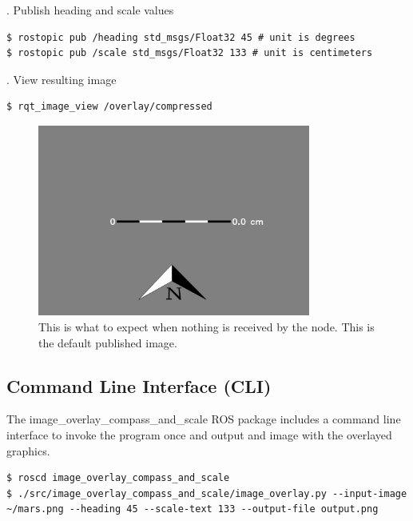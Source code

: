 \documentclass[runningheads,a4paper]{llncs}
\begin{document}
. Publish heading and scale values

\begin{lstlisting}[frame=single,basicstyle=\ttfamily\footnotesize,breaklines=true]
$ rostopic pub /heading std_msgs/Float32 45 # unit is degrees
$ rostopic pub /scale std_msgs/Float32 133 # unit is centimeters 
\end{lstlisting}

. View resulting image

\begin{lstlisting}[frame=single,basicstyle=\ttfamily\footnotesize]
$ rqt_image_view /overlay/compressed
\end{lstlisting}

\begin{figure}
\centering
\includegraphics[width=0.8\textwidth]{overlay2}
\caption{This is what to expect when nothing is received by the node. This is the default published image.}
\label{fig:overlay2}
\end{figure}


\subsection{Command Line Interface (CLI)}

The image\_overlay\_compass\_and\_scale ROS package includes a command line interface to invoke the program once and output and image with the overlayed graphics.

\begin{lstlisting}[frame=single,basicstyle=\ttfamily\footnotesize,breaklines=true,caption={Example usage of the image\_overlay\_compass\_and\_scale CLI script to save the image overlay to disk instead of publishing to ROS.}]
$ roscd image_overlay_compass_and_scale
$ ./src/image_overlay_compass_and_scale/image_overlay.py --input-image ~/mars.png --heading 45 --scale-text 133 --output-file output.png
\end{lstlisting}
\end{document}
